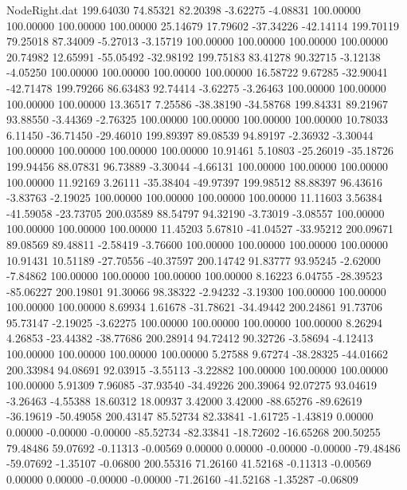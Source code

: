 \begin{filecontents}{NodeRight.dat}
 199.64030   74.85321   82.20398    -3.62275   -4.08831  100.00000  100.00000  100.00000  100.00000   25.14679   17.79602  -37.34226  -42.14114
 199.70119   79.25018   87.34009    -5.27013   -3.15719  100.00000  100.00000  100.00000  100.00000   20.74982   12.65991  -55.05492  -32.98192
 199.75183   83.41278   90.32715    -3.12138   -4.05250  100.00000  100.00000  100.00000  100.00000   16.58722    9.67285  -32.90041  -42.71478
 199.79266   86.63483   92.74414    -3.62275   -3.26463  100.00000  100.00000  100.00000  100.00000   13.36517    7.25586  -38.38190  -34.58768
 199.84331   89.21967   93.88550    -3.44369   -2.76325  100.00000  100.00000  100.00000  100.00000   10.78033    6.11450  -36.71450  -29.46010
 199.89397   89.08539   94.89197    -2.36932   -3.30044  100.00000  100.00000  100.00000  100.00000   10.91461    5.10803  -25.26019  -35.18726
 199.94456   88.07831   96.73889    -3.30044   -4.66131  100.00000  100.00000  100.00000  100.00000   11.92169    3.26111  -35.38404  -49.97397
 199.98512   88.88397   96.43616    -3.83763   -2.19025  100.00000  100.00000  100.00000  100.00000   11.11603    3.56384  -41.59058  -23.73705
 200.03589   88.54797   94.32190    -3.73019   -3.08557  100.00000  100.00000  100.00000  100.00000   11.45203    5.67810  -41.04527  -33.95212
 200.09671   89.08569   89.48811    -2.58419   -3.76600  100.00000  100.00000  100.00000  100.00000   10.91431   10.51189  -27.70556  -40.37597
 200.14742   91.83777   93.95245    -2.62000   -7.84862  100.00000  100.00000  100.00000  100.00000    8.16223    6.04755  -28.39523  -85.06227
 200.19801   91.30066   98.38322    -2.94232   -3.19300  100.00000  100.00000  100.00000  100.00000    8.69934    1.61678  -31.78621  -34.49442
 200.24861   91.73706   95.73147    -2.19025   -3.62275  100.00000  100.00000  100.00000  100.00000    8.26294    4.26853  -23.44382  -38.77686
 200.28914   94.72412   90.32726    -3.58694   -4.12413  100.00000  100.00000  100.00000  100.00000    5.27588    9.67274  -38.28325  -44.01662
 200.33984   94.08691   92.03915    -3.55113   -3.22882  100.00000  100.00000  100.00000  100.00000    5.91309    7.96085  -37.93540  -34.49226
 200.39064   92.07275   93.04619    -3.26463   -4.55388   18.60312   18.00937    3.42000    3.42000  -88.65276  -89.62619  -36.19619  -50.49058
 200.43147   85.52734   82.33841    -1.61725   -1.43819    0.00000    0.00000   -0.00000   -0.00000  -85.52734  -82.33841  -18.72602  -16.65268
 200.50255   79.48486   59.07692    -0.11313   -0.00569    0.00000    0.00000   -0.00000   -0.00000  -79.48486  -59.07692   -1.35107   -0.06800
 200.55316   71.26160   41.52168    -0.11313   -0.00569    0.00000    0.00000   -0.00000   -0.00000  -71.26160  -41.52168   -1.35287   -0.06809

\end{filecontents}
